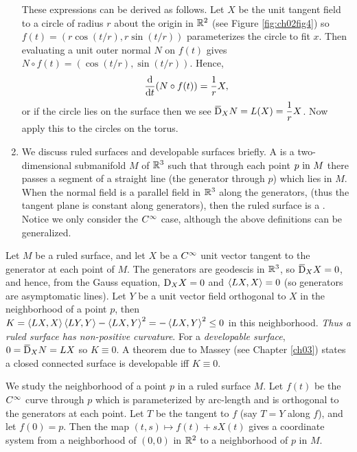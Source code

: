 \documentclass[../main]{subfiles}
\begin{document}
\begin{enumerate}
    These expressions can be derived as follows. Let $X$ be the unit tangent field to a circle of radius $r$ about the origin in $\mathbb{R}^2$ (see Figure \ref{fig:ch02fig4}) so $f(t) = (r\cos(t/r),r\sin(t/r))$ parameterizes the circle to fit $x$. Then evaluating a unit outer normal $N$ on $f(t)$ gives $N\circ f(t) = (\cos(t/r),\sin(t/r))$. Hence, \[\dv{}{t}(N\circ f(t))= \dfrac{1}{r}X,\] or if the circle lies on the surface then we see $\covariant_XN = L(X) = \dfrac{1}{r}X$. Now apply this to the circles on the torus. \label{enu:CH02S05.5} 
    \item We discuss ruled surfaces and developable surfaces briefly. A  is a two-dimensional submanifold $M$ of $\mathbb{R}^3$ such that through each point $p\text{ in } M$ there passes a segment of a straight line (the generator through $p$) which lies in $M$. When the normal field is a parallel field in $\mathbb{R}^3$ along the generators, (thus the tangent plane is constant along generators), then the ruled surface is a . Notice we only consider the $C^\infty$ case, although the above definitions can be generalized. \label{enu:CH02S05.6}
\end{enumerate}

Let $M$ be a ruled surface, and let $X$ be a $C^\infty$ unit vector tangent to the generator at each point of $M$. The generators are geodescis in $\mathbb{R}^3$, so $\covariant_XX = 0$, and hence, from the Gauss equation, $\mathrm{D}_XX = 0$ and $\left\langle LX,X\right\rangle = 0$ (so generators are asymptomatic lines). Let $Y$ be a unit vector field orthogonal to $X$ in the neighborhood of a point $p$, then $K = \left\langle LX,X\right\rangle \left\langle LY,Y\right\rangle - \left\langle LX,Y\right\rangle^{2} = -\left\langle LX,Y\right\rangle^{2}\le 0$ in this neighborhood. \emph{Thus a ruled surface has non-positive curvature}. For a \emph{developable surface}, $0 = \covariant_XN = LX$ so $K \equiv 0$. A theorem due to Massey (see Chapter \ref{ch03}) states a closed connected surface is developable iff $K \equiv 0$.

We study the neighborhood of a point $p$ in a ruled surface $M$. Let $f(t)$ be the $C^\infty$ curve through $p$ which is parameterized by arc-length and is orthogonal to the generators at each point. Let $T$ be the tangent to $f$ (say $T = Y$ along $f$), and let $f(0) = p$. Then the map $(t,s)\mapsto f(t)+sX(t)$ gives a coordinate system from a neighborhood of $(0, 0)$ in $\mathbb{R}^2$ to a neighborhood of $p$ in $M$. 

\end{document}
